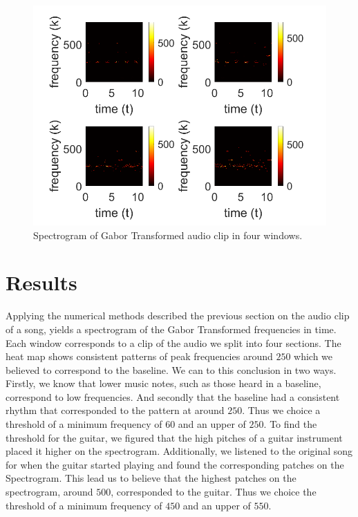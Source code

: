 \documentclass[12pt]{article}%
\begin{document}
\begin{figure}
    \center
    \includegraphics[width = 0.8\linewidth]{specto1.png}
    \caption{Spectrogram of Gabor Transformed audio clip in four windows.}
\end{figure}

\section{Results} \label{Sec: Results}

Applying the numerical methods described the previous section on the audio clip of a song, yields a spectrogram of the Gabor Transformed frequencies in time. Each window corresponds to a clip of the audio we split into four sections. The heat map shows consistent patterns of peak frequencies around $250$ which we believed to correspond to the baseline. We can to this conclusion in two ways. Firstly, we know that lower music notes, such as those heard in a baseline, correspond to low frequencies. And secondly that the baseline had a consistent rhythm that corresponded to the pattern at around $250$. Thus we choice a threshold of a minimum frequency of $60$ and an upper of $250$. To find the threshold for the guitar, we figured that the high pitches of a guitar instrument placed it higher on the spectrogram. Additionally, we listened to the original song for when the guitar started playing and found the corresponding patches on the Spectrogram. This lead us to believe that the highest patches on the spectrogram, around $500$, corresponded to the guitar. Thus we choice the threshold of a minimum frequency of $450$ and an upper of $550$. 
\end{document}
